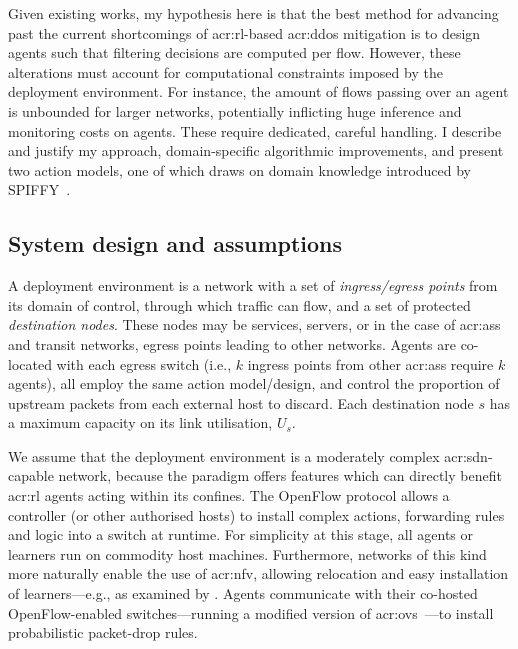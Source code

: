 Given existing works, my hypothesis here is that the best method for advancing past the current shortcomings of \gls{acr:rl}-based \gls{acr:ddos} mitigation is to design agents such that filtering decisions are computed per flow.
However, these alterations must account for computational constraints imposed by the deployment environment.
For instance, the amount of flows passing over an agent is unbounded for larger networks, potentially inflicting huge inference and monitoring costs on agents.
These require dedicated, careful handling.
I describe and justify my approach, domain-specific algorithmic improvements, and present two action models, one of which draws on domain knowledge introduced by SPIFFY~\parencite{DBLP:conf/ndss/KangGS16}.

\subsection{System design and assumptions}
A deployment environment is a network with a set of \emph{ingress/egress points} from its domain of control, through which traffic can flow, and a set of protected \emph{destination nodes}.
These nodes may be services, servers, or in the case of \glspl{acr:as} and transit networks, egress points leading to other networks.
Agents are co-located with each egress switch (i.e., $k$ ingress points from other \glspl{acr:as} require $k$ agents), all employ the same action model/design, and control the proportion of upstream packets from each external host to discard.
Each destination node $s$ has a maximum capacity on its link utilisation, $U_s$.

We assume that the deployment environment is a moderately complex \gls{acr:sdn}-capable network, because the paradigm offers features which can directly benefit \gls{acr:rl} agents acting within its confines.
The OpenFlow protocol allows a controller (or other authorised hosts) to install complex actions, forwarding rules and logic into a switch at runtime.
For simplicity at this stage, all agents or learners run on commodity host machines.
Furthermore, networks of this kind more naturally enable the use of \gls{acr:nfv}, allowing relocation and easy installation of learners---e.g., as examined by \textcite{DBLP:journals/tnsm/JakariaRF19}.
Agents communicate with their co-hosted OpenFlow-enabled switches---running a modified version of \gls{acr:ovs}~\parencite{open-vswitch,DBLP:conf/nsdi/PfaffPKJZRGWSSA15}---to install probabilistic packet-drop rules.

